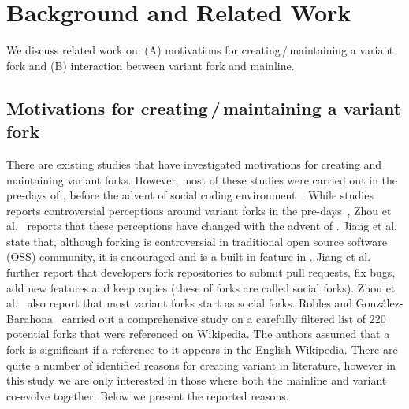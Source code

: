 \section{Background and Related Work}
\label{sec:background}
We discuss related work on: (A) motivations for creating\,/\,maintaining a variant fork and (B) interaction between variant fork and mainline.%

\subsection{Motivations for creating\,/\,maintaining a variant fork}
\label{sec:motivations}
There are existing studies that have investigated motivations for creating and maintaining variant forks. However, most of these studies were carried out in the pre-\gh days of \sourceforge, before the advent of social coding environment~\cite{Linus:2012Perspectives,Gregorio:2012,Viseur:2012Forks,Linus:2013CodeForking,Laurent:2008,Linus:2011ToFork}. While studies reports controversial perceptions around variant forks in the pre-\gh days~\cite{Chua:Forking:2017,Dixion:2009Forks,Ernst:2010,Linus:2011ToFork,Linus:2014Hackers,Raymond:Cathedral:2001,pete}, Zhou et al.~\cite{Zhou:2020} reports that these perceptions have changed with the advent of \gh. 
Jiang et al.~\cite{Lo:2017} state that, although forking is controversial in traditional open source software (OSS) community, it is encouraged and is a built-in feature in \gh. 
Jiang et al.~\cite{Lo:2017} further report that developers fork repositories to submit pull requests, fix bugs, add new features and keep copies (these of forks are called social forks). Zhou et al.~\cite{Zhou:2020} also report that most variant forks start as social forks. 
Robles and Gonz{\'a}lez-Barahona~\cite{Gregorio:2012} carried out a comprehensive study on a carefully filtered list of 220 potential forks that were referenced on Wikipedia. The authors assumed that a fork is significant if a reference to it appears in the English Wikipedia.
There are quite a number of identified reasons for creating variant in literature, however in this study we are only interested in those where both the mainline and variant co-evolve together. Below we present the reported reasons. 

